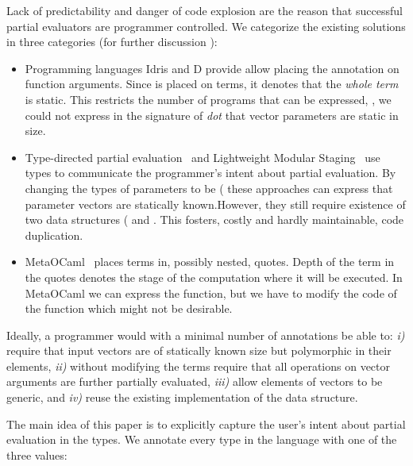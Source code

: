 Lack of predictability and danger of code explosion are the reason that
 successful partial evaluators
 \cite{brady2010,taha_multi-stage_1997,rompf2012lightweight,wurthinger2013one,le2004specialization}
  are programmer controlled. We categorize the existing solutions in three categories
 (for further discussion \cf {}):

\begin{itemize}
 \item Programming languages Idris and D provide allow placing the 
  annotation on function arguments. Since  is placed on terms, it
  denotes that the \emph{whole term} is static. This restricts the number of programs
  that can be expressed, \eg, we could not express in the signature of \emph{dot} that
  vector parameters are static in size.

 \item Type-directed partial evaluation~\cite{danvy1999type} and
  Lightweight Modular Staging~\cite{rompf2012lightweight} use types to communicate
  the programmer's intent about partial evaluation. By changing the types of parameters
  to be (\eg {} these approaches can express that parameter vectors
  are statically known.However, they still require existence of two data structures
  (\eg {} and . This fosters, costly and hardly maintainable, code duplication.

 \item MetaOCaml~\cite{taha_multi-stage_1997} places terms in, possibly nested,
   quotes. Depth of the term in the quotes denotes the stage of the computation
   where it will be executed. In MetaOCaml we can express the  function,
   but we have to modify the code of the  function which might not be desirable.

\end{itemize}



Ideally, a programmer would with a minimal number of annotations be able to:
 \emph{i)} require that input vectors are of statically known size but polymorphic
  in their elements, \emph{ii)} without modifying the terms require that all operations
  on vector arguments are further partially evaluated, \emph{iii)} allow elements
  of vectors to be generic, and \emph{iv)} reuse the existing implementation of
  the  data structure.

The main idea of this paper is to explicitly capture the user's intent about partial
evaluation in the types. We annotate every type in the language with one of the three values:

